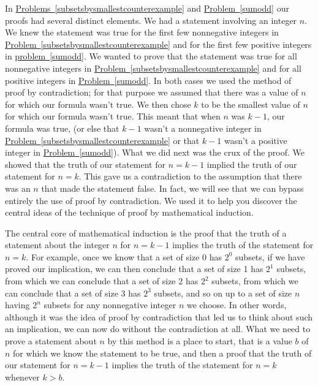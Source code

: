 \documentclass[10pt,]{book}
\theoremstyle{plain}
\theoremstyle{definition}
\theoremstyle{definition}
\numberwithin{equation}{chapter}
\begin{document}
In \hyperref[subsetsbysmallestcounterexample]{Problems~\ref{subsetsbysmallestcounterexample}} and \hyperref[sumodd]{Problem~\ref{sumodd}} our proofs had several distinct elements. We had a statement involving an integer \(n\). We knew the statement was true for the first few nonnegative integers in \hyperref[subsetsbysmallestcounterexample]{Problem~\ref{subsetsbysmallestcounterexample}} and for the first few positive integers in \hyperref[sumodd]{problem~\ref{sumodd}}. We wanted to prove that the statement was true for all nonnegative integers in \hyperref[subsetsbysmallestcounterexample]{Problem~\ref{subsetsbysmallestcounterexample}} and for all positive integers in \hyperref[sumodd]{Problem~\ref{sumodd}}. In both cases we used the method of proof by contradiction; for that purpose we assumed that there was a value of \(n\) for which our formula wasn't true. We then chose \(k\) to be the smallest value of \(n\) for which our formula wasn't true. This meant that when \(n\) was \(k-1\), our formula was true, (or else that \(k-1\) wasn't a nonnegative integer in \hyperref[subsetsbysmallestcounterexample]{Problem~\ref{subsetsbysmallestcounterexample}} or that \(k-1\) wasn't a positive integer in \hyperref[sumodd]{Problem~\ref{sumodd}}). What we did next was the crux of the proof. We showed that the truth of our statement for \(n=k-1\) implied the truth of our statement for \(n=k\). This gave us a contradiction to the assumption that there was an \(n\) that made the statement false. In fact, we will see that we can bypass entirely the use of proof by contradiction. We used it to help you discover the central ideas of the technique of proof by mathematical induction.%
\par
The central core of mathematical induction is the proof that the truth of a statement about the integer \(n\) for \(n=k-1\) implies the truth of the statement for \(n=k\). For example, once we know that a set of size 0 has \(2^0\) subsets, if we have proved our implication, we can then conclude that a set of size 1 has \(2^1\) subsets, from which we can conclude that a set of size 2 has \(2^2\) subsets, from which we can conclude that a set of size 3 has \(2^3\) subsets, and so on up to a set of size \(n\) having \(2^n\) subsets for any nonnegative integer \(n\) we choose. In other words, although it was the idea of proof by contradiction that led us to think about such an implication, we can now do without the contradiction at all. What we need to prove a statement about \(n\) by this method is a place to start, that is a value \(b\) of \(n\) for which we know the statement to be true, and then a proof that the truth of our statement for \(n=k-1\) implies the truth of the statement for \(n=k\) whenever \(k>b\).%
\typeout{************************************************}
\typeout{************************************************}
\end{document}
